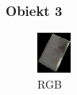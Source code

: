 \documentclass[a4paper,12pt]{article}  %
\begin{document}
\subsubsection{Obiekt 3}
\begin{figure}[H]
    \centering
    \begin{minipage}{0.24\textwidth}
        \centering
        \includegraphics[width=\linewidth]{spektralne/rgb_budynek3.png}
        \caption*{RGB}
    \end{minipage}
    \begin{minipage}{0.24\textwidth}
        \centering

\end{minipage}
\end{figure}
\end{document}
